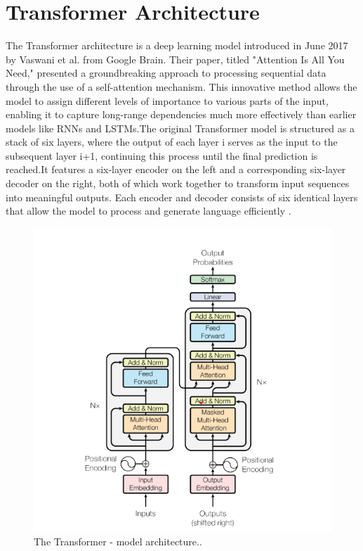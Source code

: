 \section{ Transformer Architecture}
The Transformer architecture is a deep learning model introduced in June 2017 by Vaswani et al. from Google Brain. Their paper, titled "Attention Is All You Need," presented a groundbreaking approach to processing sequential data through the use of a self-attention mechanism. This innovative method allows the model to assign different levels of importance to various parts of the input, enabling it to capture long-range dependencies much more effectively than earlier models like RNNs and LSTMs.The original Transformer model is structured as a stack of six layers, where the output of each layer i serves as the input to the subsequent layer i+1, continuing this process until the final prediction is reached.It features a six-layer encoder on the left and a corresponding six-layer decoder on the right,  both of which work together to transform input sequences into meaningful outputs. Each encoder and decoder consists of six identical layers that allow the model to process and generate language efficiently \cite{rothman2021transformers}.
\begin{figure}[htbp]
	
	\centerline{\includegraphics[width=.6\linewidth]{
			Figures/trasformers.png}}
	\caption{The Transformer - model architecture..}
	\label{trasformers.png}
	
\end{figure}
